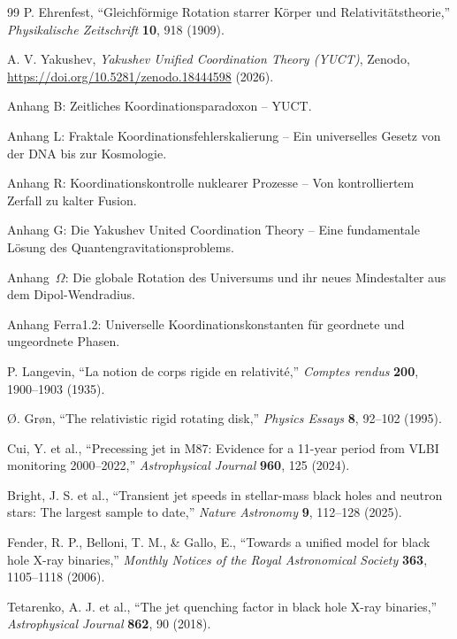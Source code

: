 \documentclass[12pt,a4paper]{article}
\begin{document}
	\begin{thebibliography}{99}
		P. Ehrenfest, ``Gleichf{\"o}rmige Rotation starrer K{\"o}rper und Relativit{\"a}tstheorie,'' \emph{Physikalische Zeitschrift} \textbf{10}, 918 (1909).
		
		A. V. Yakushev, \emph{Yakushev Unified Coordination Theory (YUCT)}, Zenodo, \url{https://doi.org/10.5281/zenodo.18444598} (2026).
		
		Anhang B: Zeitliches Koordinationsparadoxon -- YUCT.
		
		Anhang L: Fraktale Koordinationsfehlerskalierung -- Ein universelles Gesetz von der DNA bis zur Kosmologie.
		
		Anhang R: Koordinationskontrolle nuklearer Prozesse -- Von kontrolliertem Zerfall zu kalter Fusion.
		
		Anhang G: Die Yakushev United Coordination Theory -- Eine fundamentale Lösung des Quantengravitationsproblems.
		
		Anhang~\(\Omega\): Die globale Rotation des Universums und ihr neues Mindestalter aus dem Dipol-Wendradius.
		
		Anhang Ferra1.2: Universelle Koordinationskonstanten für geordnete und ungeordnete Phasen.
		
		P. Langevin, ``La notion de corps rigide en relativit{\'e},'' \emph{Comptes rendus} \textbf{200}, 1900--1903 (1935).
		
		{\O}. Gr{\o}n, ``The relativistic rigid rotating disk,'' \emph{Physics Essays} \textbf{8}, 92--102 (1995).
		
		Cui, Y. et al., ``Precessing jet in M87: Evidence for a 11-year period from VLBI monitoring 2000–2022,'' \emph{Astrophysical Journal} \textbf{960}, 125 (2024).
		
		Bright, J. S. et al., ``Transient jet speeds in stellar-mass black holes and neutron stars: The largest sample to date,'' \emph{Nature Astronomy} \textbf{9}, 112–128 (2025).
		
		Fender, R. P., Belloni, T. M., \& Gallo, E., ``Towards a unified model for black hole X-ray binaries,'' \emph{Monthly Notices of the Royal Astronomical Society} \textbf{363}, 1105–1118 (2006).
		
		Tetarenko, A. J. et al., ``The jet quenching factor in black hole X-ray binaries,'' \emph{Astrophysical Journal} \textbf{862}, 90 (2018).
		

\end{thebibliography}
\end{document}
